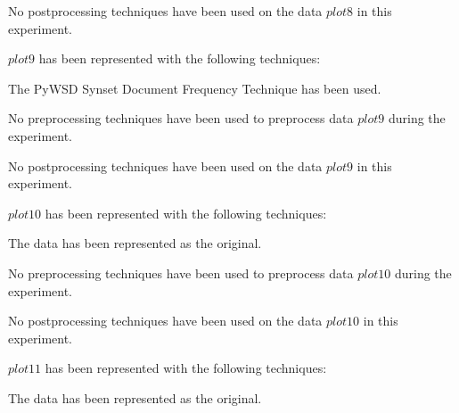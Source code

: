 \documentclass[11pt]{article}
\begin{document}
No postprocessing techniques have been used on the data $ plot8 $ in this experiment.
\hfill\break
\hfill\break



$ plot9 $  has been represented with the following techniques:
\hfill\break
\hfill\break



The PyWSD Synset Document Frequency Technique has been used.
\hfill\break
\hfill\break



No preprocessing techniques have been used to preprocess data $ plot9 $ during the experiment.
\hfill\break
\hfill\break



No postprocessing techniques have been used on the data $ plot9 $ in this experiment.
\hfill\break
\hfill\break



$ plot10 $  has been represented with the following techniques:
\hfill\break
\hfill\break



The data has been represented as the original.
\hfill\break
\hfill\break



No preprocessing techniques have been used to preprocess data $ plot10 $ during the experiment.
\hfill\break
\hfill\break



No postprocessing techniques have been used on the data $ plot10 $ in this experiment.
\hfill\break
\hfill\break



$ plot11 $  has been represented with the following techniques:
\hfill\break
\hfill\break



The data has been represented as the original.
\hfill\break
\hfill\break
\end{document}
